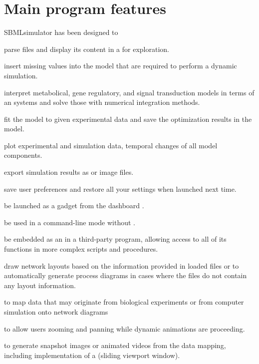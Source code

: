 \section{Main program features}

SBMLsimulator has been designed to
\begin{dinglist}{52}
\item parse \SBML files and display its content in a \GUI for exploration.
\item insert missing values into the model that are required to perform a dynamic simulation.
\item interpret metabolical, gene regulatory, and signal
transduction models in terms of an \ODE systems and solve those with numerical integration methods.
\item fit the model to given experimental data and save the optimization results in the model.
\item plot experimental and simulation data, \ie temporal changes of all model components.
\item export simulation results as \CSV or image files.
\item save user preferences and restore all your settings when launched next time.
\item be launched as a \Garuda gadget from the \Garuda dashboard \citep{Ghosh2011}.
\item be used in a command-line mode without \GUI.
\item be embedded as an \API in a third-party program, allowing access to all of its functions in more complex scripts and procedures.
\item draw network layouts based on the information provided in loaded \SBML files or to automatically generate \SBGN process diagrams in cases where the \SBML files do not contain any layout information.
\item to map data that may originate from biological experiments or from computer simulation onto \SBGN network diagrams
\item to allow users zooming and panning while dynamic animations are proceeding.
\item to generate snapshot images or animated videos from the data mapping, including  implementation of a \KenBurnsEffect (sliding viewport window).
\end{dinglist}


